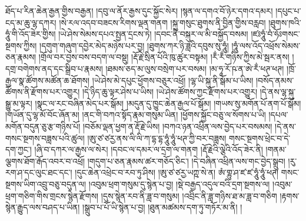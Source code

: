 ཐོད་པ་རིན་ཆེན་རྒྱན་གྱིས་བརྒྱན། །དབུ་ལ་ནོར་རྒྱས་དུང་སྐྱོང་སེར། །སྙན་ལ་དགའ་བོ་ཉེར་དགའ་དམར། །དཔུང་པ་ངད་མ་ཆུ་ལྷ་དཀར། །སེ་རལ་འདབ་བཟངས་རིགས་ལྡན་གནག །སྐུ་གསུང་ཐུགས་ནི་བྱིན་གྱིས་བརླབ། །ཐུགས་ཁའི་ཧཱུཾ་གི་འོད་ཟེར་གྱིས། །ཡེ་ཤེས་སེམས་དཔའ་སྤྱན་དྲངས་ཏེ། །དབང་ནི་བསྐུར་ལ་མི་བསྐྱོད་བསམ། །ཛཿཧཱུཾ་བཾ་ཧོཿགསང་སྔགས་ཀྱིས། །དགུག་གཞུག་དབྱེར་མེད་མཉེས་པར་བྱ། །ཐུགས་ཀར་ཉི་ཟླའི་དབུས་སུ་ཧཱུཾ། །ཧཱུཾ་ལས་འོད་འཕྲོས་སེམས་ཅན་རྣམས། །གྲོལ་བར་བྱས་བས་བདག་ལ་བསྡུ། །རྡོ་རྗེ་སྲིན་པོའི་ཁུ་ཚུར་བསྟམ། །རྂ་རྂ་གཉིས་ཀྱིས་མེ་སྦར་ནས། །དགྲ་བགེགས་ནད་དང་སྒྲིབ་པ་རྣམས། །ཐམས་ཅད་མ་ལུས་བསྲེག་པར་བསམ། །མ་ཧཱ་རོ་ཥ་ན་ཨེ་རྂ་ཕཊ་ཕཊ། །ཁྲོ་རྒྱལ་སྣ་ཚོགས་མཚོན་ཆ་ཐོགས། །ཡེ་ཤེས་མེ་དཔུང་ཕྱོགས་བཅུར་འཕྲོ། །ལྷ་ཡི་སྐུ་ནི་སྒོམ་པ་ཡིས། །བསོད་ནམས་ཚོགས་ནི་རྫོགས་པར་འགྱུར། །དེ་ཉིད་ཆུ་ལྟར་ཤེས་པ་ཡིས། །ཡེ་ཤེས་ཚོགས་ཀྱང་རྫོགས་པར་འགྱུར། །དེ་ནས་ལྷ་སྐུ་སྒྱུ་མ་ལྟར། །སྣང་ལ་རང་བཞིན་མེད་པར་སྒོམ། །མདུན་དུ་ཁྱུང་ཆེན་རྒྱལ་པོ་སྒོམ། །གཡས་སུ་མགོན་པོ་ནག་པོ་སྒོམ། །གཡོན་དུ་ལྷ་མོ་བོང་ཞོན་མ། །ནང་གི་བཀའ་སྟོད་རྣམ་གསུམ་ཡིན། །ཕྱོགས་སྐྱོང་བཅུ་ལ་སོགས་པ་ཡི། །དཔལ་མགོན་བདུན་ཅུ་རྩ་གཉིས་པོ། །བཅོམ་ལྡན་ཕྱག་ན་རྡོ་རྗེ་ཡིས། །བཀའ་ཉན་འཕྲིན་ལས་བྱེད་པར་བསམས། །དེ་ནས་གསང་སྔགས་བཟླས་པའི་ཚུལ། །ཨུ་ཙ་ཙརྱ་ནས་ལི་ལི་ཀ་དྷ་དྷ་ཧཱུཾ་ཧཱུཾ་ཕཊ་ཀྱི་བར་བཟླས། གསང་སྔགས་ཕྲེང་བ་དེ་དག་ཀྱང་། །ཞི་བ་དཀར་ལ་རྒྱས་ལ་སེར། །དབང་ལ་དམར་ལ་དྲག་ལ་གནག །རྡོ་རྗེའི་ལྕེའི་འོད་ཟེར་ནི། །གནམ་ལྕགས་ཐོག་རྒོད་འབར་བ་འཕྲོ། །གདུག་པ་ཅན་རྣམས་ཚར་གཅོད་ཅིང་། །དེ་བཞིན་འཕྲིན་ལས་གང་བྱེད་སྒྲུབ། །རུ་རག་ཤ་དང་ལུང་ཐང་དང་། །དུང་ཆེན་འཕྲེང་བ་རབ་ཏུ་ཤིས། །ཨུ་ཙ་ཙརྱ་ཡཀྵ་སེ་ན། ཨཾ་གྷུ་ཤ་ཛ་ཛ་ཧཱུཾ་ཧཱུཾ་ཕཊ། གསང་སྔགས་ཡིག་འབྲུ་བཅུ་བདུན་ལ། །འབུམ་ཕྲག་གསུམ་དུ་སྙེན་པ་བྱ། །སྡེ་བརྒྱད་འདུལ་བའི་དྲག་སྔགས་ལ། །འབུམ་ཕྲག་གཅིག་གིས་གྲངས་སྙེན་རྫོགས། །དུས་སྙེན་རབ་ནི་ཟླ་བ་གསུམ། །འབྲིང་ནི་ཟླ་གཉིས་ཐ་མ་ཟླ་བ་གཅིག །རྟགས་སྙེན་རྒྱུད་ལས་བཤད་པ་ཡིན། །སྒྲུབ་པ་པོ་ཡི་སྙེན་པ་བྱ། །ཐུན་མཚམས་དག་ཏུ་གཏོར་མ་ནི། །
